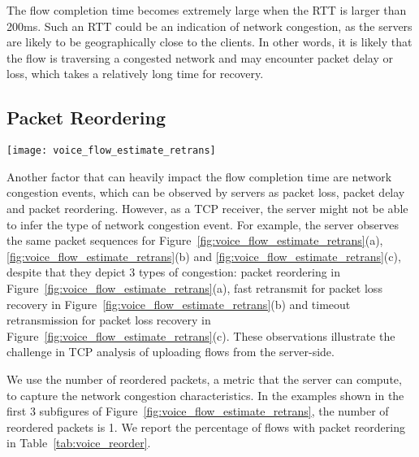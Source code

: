 The flow completion time becomes extremely large when the RTT is larger than 200ms. Such an RTT could be an indication of network congestion, as the servers are likely to be geographically close to the clients. In other words, it is likely that the flow is traversing a congested network and may encounter packet delay or loss, which takes a relatively long time for recovery.

\subsection{Packet Reordering}
\label{sec:v_pd}

\begin{figure*}[th]
\centering
	\texttt{[image: voice\_flow\_estimate\_retrans]}
\caption{Server could not distinguish packet reordering events, which are (a) packet reordering, (b) fast retransmit, and (c) timeout retransmission. Server may identify some timeout retransmissions as long packet delay (d).}
\label{fig:voice_flow_estimate_retrans}
\minsqueeze
\end{figure*}

Another factor that can heavily impact the flow completion time are network congestion events, which can be observed by servers as packet loss, packet delay and packet reordering. However, as a TCP receiver, the server might not be able to infer the type of network congestion event. For example, the server observes the same packet sequences for Figure~\ref{fig:voice_flow_estimate_retrans}(a), \ref{fig:voice_flow_estimate_retrans}(b) and \ref{fig:voice_flow_estimate_retrans}(c), despite that they depict 3 types of congestion: packet reordering in Figure~\ref{fig:voice_flow_estimate_retrans}(a), fast retransmit for packet loss recovery in Figure~\ref{fig:voice_flow_estimate_retrans}(b) and timeout retransmission for packet loss recovery in Figure~\ref{fig:voice_flow_estimate_retrans}(c). These observations illustrate the challenge in TCP analysis of uploading flows from the server-side.

We use the number of reordered packets, a metric that the server can compute, to capture the network congestion characteristics. In the examples shown in the first 3 subfigures of Figure~\ref{fig:voice_flow_estimate_retrans}, the number of reordered packets is 1. %
We report the percentage of flows with packet reordering in Table~\ref{tab:voice_reorder}.

